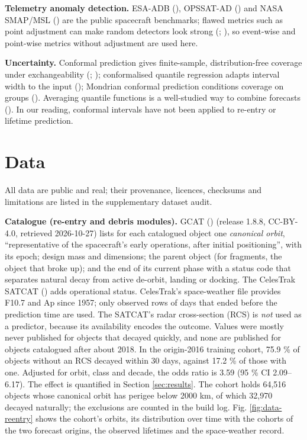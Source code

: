 \documentclass[
]{article}
\newcounter{none} %
\begin{document}
\textbf{Telemetry anomaly detection.} ESA-ADB
(), OPSSAT-AD
() and NASA
SMAP/MSL () are the
public spacecraft benchmarks; flawed metrics such as point adjustment
can make random detectors look strong
(;
), so event-wise and
point-wise metrics without adjustment are used here.

\textbf{Uncertainty.} Conformal prediction gives finite-sample,
distribution-free coverage under exchangeability
(;
); conformalised
quantile regression adapts interval width to the input
(); Mondrian conformal
prediction conditions coverage on groups
(). Averaging
quantile functions is a well-studied way to combine forecasts
(). In
our reading, conformal intervals have not been applied to re-entry or
lifetime prediction.

\section{Data}\label{sec:data}

All data are public and real; their provenance, licences, checksums and
limitations are listed in the supplementary dataset audit.

\textbf{Catalogue (re-entry and debris modules).} GCAT
() (release 1.8.8,
CC-BY-4.0, retrieved 2026-10-27) lists for each catalogued object one
\emph{canonical orbit}, ``representative of the spacecraft's early
operations, after initial positioning'', with its epoch; design mass and
dimensions; the parent object (for fragments, the object that broke up);
and the end of its current phase with a status code that separates
natural decay from active de-orbit, landing or docking. The CelesTrak
SATCAT () adds
operational status. CelesTrak's space-weather file provides F10.7 and Ap
since 1957; only observed rows of days that ended before the prediction
time are used. The SATCAT's radar cross-section (RCS) is \emph{not} used
as a predictor, because its availability encodes the outcome. Values
were mostly never published for objects that decayed quickly, and none
are published for objects catalogued after about 2018. In the
origin-2016 training cohort, 75.9 \% of objects without an RCS decayed
within 30 days, against 17.2 \% of those with one. Adjusted for orbit,
class and decade, the odds ratio is 3.59 (95 \% CI 2.09--6.17). The
effect is quantified in Section \ref{sec:results}. The cohort holds
64,516 objects whose canonical orbit has perigee below 2000 km, of which
32,970 decayed naturally; the exclusions are counted in the build log.
Fig. \ref{fig:data-reentry} shows the cohort's orbits, its distribution
over time with the cohorts of the two forecast origins, the observed
lifetimes and the space-weather record.
\end{document}
